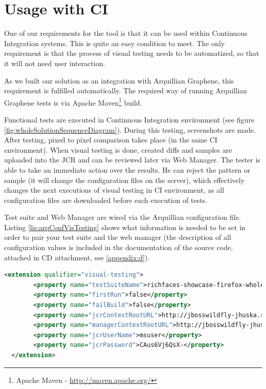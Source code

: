 \documentclass[11pt,oneside,final]{fithesis2}
\begin{document}
  \section{Usage with CI}
  One of our requirements for the tool is that it can be used within Continuous Integration systems. This is quite an easy condition to meet.
  The only requirement is that the process of visual testing needs to be automatized, so that it will not need user interaction.
  
  As we built our solution as an integration with Arquillian Graphene, this requirement is fulfilled automatically. The required way of running
  Arquillian Graphene tests is via Apache Maven\footnote{Apache Maven - \url{http://maven.apache.org/}} build.
  
  Functional tests are executed in Continuous Integration environment (see figure \ref{fig:wholeSolutionSequenceDiagram}). During this testing,
  screenshots are made. After testing, pixed to pixel comparison takes place (in the same CI environment). When visual testing is done, created
  diffs and samples are uploaded into the JCR and can be reviewed later via Web Manager. The tester is able to take an immediate action
  over the results. He can reject the pattern or sample (it will change the configuration files on the server), which effectively changes the next executions of 
  visual testing in CI environment, as all configuration files are downloaded before each execution of tests.
  
  Test suite and Web Manager are wired via the Arquillian configuration file. Listing \ref{lis:arqConfVisTesting} shows what information is needed 
  to be set in order to pair your test suite and the web manager (the description of all configuration values is included in the documentation
  of the source code, attached in CD attachment, see \ref{appendix:d}).
  
  \begin{lstlisting}[caption=Example of configuration for Graphene Visual Testing Extension,label=lis:arqConfVisTesting,breaklines=true, language=xml]
  <extension qualifier="visual-testing">
        <property name="testSuiteName">richfaces-showcase-firefox-whole</property>      
        <property name="firstRun">false</property>
        <property name="failBuild">false</property>
        <property name="jcrContextRootURL">http://jbosswildfly-jhuska.rhcloud.com/modeshape-rest/graphene-visual-testing/default</property>
        <property name="managerContextRootURL">http://jbosswildfly-jhuska.rhcloud.com/</property>
        <property name="jcrUserName">msuser</property>
        <property name="jcrPassword">CAus6Vj6QsX-</property>
  </extension>
  \end{lstlisting}
  
\end{document}
